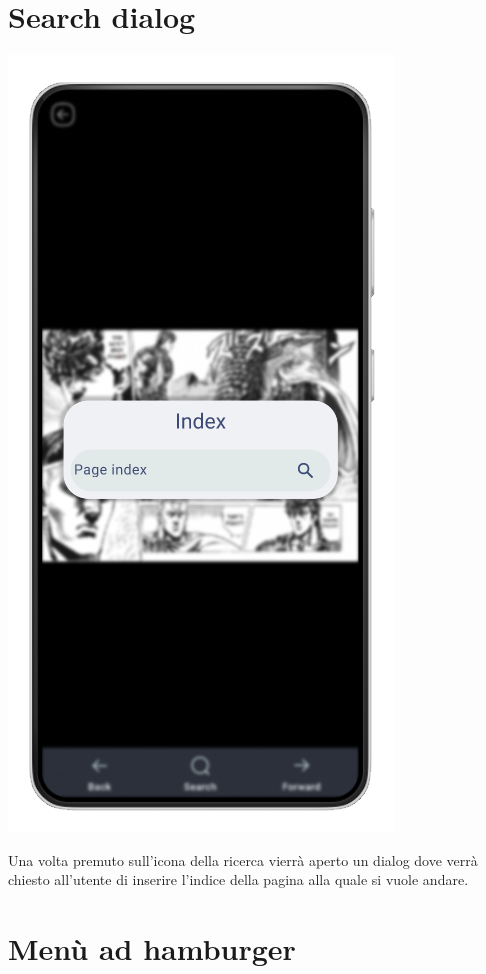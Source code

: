 \documentclass{report}
\begin{document}
\section{Search dialog}

\begin{center}
   \includegraphics[scale=0.4]{search_dialog.png}
\end{center}

Una volta premuto sull'icona della ricerca vierrà aperto un dialog dove verrà chiesto all'utente di inserire l'indice della pagina alla quale si vuole andare.

\section{Menù ad hamburger}
\label{sec:hamburger}
\end{document}
